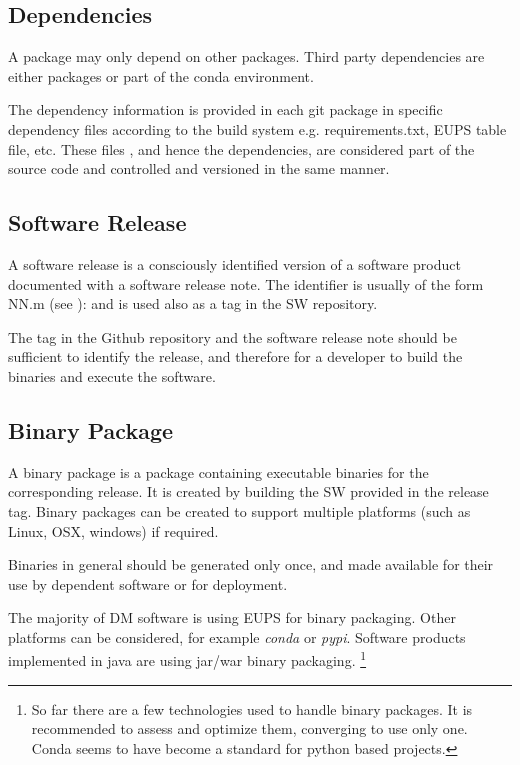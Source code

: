 \subsection{Dependencies} \label{sec:dependencies}


A package may only depend on other packages. Third party dependencies are either packages or part of the conda environment.

The dependency information is provided in each git package in specific dependency files  according to the build system e.g.  requirements.txt, EUPS table file, etc.
These files , and hence the dependencies,  are considered part of the source code and controlled  and versioned in the same manner.


\subsection{Software Release} \label{sec:swrel}

A software release is  a consciously identified version of a  software product
documented with a software release note.
The identifier is usually of the form NN.m (see ): and is used also as a  tag in the SW repository.

The tag in the Github repository and the software release note should be sufficient to identify the release, and therefore for a developer
to build the binaries and execute the software.



\subsection{Binary Package} \label{sec:swbpkg}

A binary package is a package containing executable binaries for the corresponding release.
It is created by building the SW provided in the release tag.
Binary packages can be created to support multiple platforms (such as Linux, OSX, windows) if required.

Binaries in general should be generated only once, and made available for their use by dependent software or for deployment.

The majority of DM software is using EUPS for binary packaging. Other platforms can be considered, for example \textit{conda} or \textit{pypi}.
Software products implemented in java are using jar/war binary packaging.
\footnote{So far there are a few technologies used to handle binary packages. It is recommended to assess and optimize them, converging to use only one.
Conda seems to have become a standard for python based projects.}


